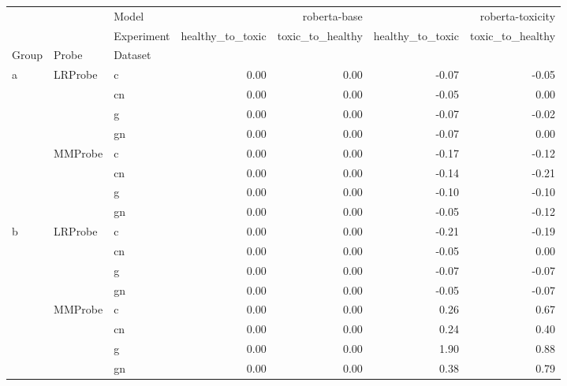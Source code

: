 \begin{tabular}{lllrrrr}
\toprule
 &  & Model & \multicolumn{2}{r}{roberta-base} & \multicolumn{2}{r}{roberta-toxicity} \\
 &  & Experiment & healthy_to_toxic & toxic_to_healthy & healthy_to_toxic & toxic_to_healthy \\
Group & Probe & Dataset &  &  &  &  \\
\midrule
\multirow[t]{8}{*}{a} & \multirow[t]{4}{*}{LRProbe} & c & 0.00 & 0.00 & -0.07 & -0.05 \\
 &  & cn & 0.00 & 0.00 & -0.05 & 0.00 \\
 &  & g & 0.00 & 0.00 & -0.07 & -0.02 \\
 &  & gn & 0.00 & 0.00 & -0.07 & 0.00 \\
\cline{2-7}
 & \multirow[t]{4}{*}{MMProbe} & c & 0.00 & 0.00 & -0.17 & -0.12 \\
 &  & cn & 0.00 & 0.00 & -0.14 & -0.21 \\
 &  & g & 0.00 & 0.00 & -0.10 & -0.10 \\
 &  & gn & 0.00 & 0.00 & -0.05 & -0.12 \\
\cline{1-7} \cline{2-7}
\multirow[t]{8}{*}{b} & \multirow[t]{4}{*}{LRProbe} & c & 0.00 & 0.00 & -0.21 & -0.19 \\
 &  & cn & 0.00 & 0.00 & -0.05 & 0.00 \\
 &  & g & 0.00 & 0.00 & -0.07 & -0.07 \\
 &  & gn & 0.00 & 0.00 & -0.05 & -0.07 \\
\cline{2-7}
 & \multirow[t]{4}{*}{MMProbe} & c & 0.00 & 0.00 & 0.26 & 0.67 \\
 &  & cn & 0.00 & 0.00 & 0.24 & 0.40 \\
 &  & g & 0.00 & 0.00 & 1.90 & 0.88 \\
 &  & gn & 0.00 & 0.00 & 0.38 & 0.79 \\
\cline{1-7} \cline{2-7}
\bottomrule
\end{tabular}
